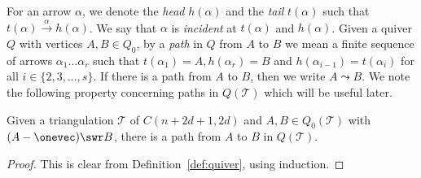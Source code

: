 For an arrow $\alpha$, we denote the \emph{head} $h(\alpha)$ and the \emph{tail} $t(\alpha)$ such that $t(\alpha) \xrightarrow{\alpha} h(\alpha)$. We say that $\alpha$ is \emph{incident} at $t(\alpha)$ and $h(\alpha)$. Given a quiver $Q$ with vertices $A,B \in Q_{0}$, by a \emph{path} in $Q$ from $A$ to $B$ we mean a finite sequence of arrows $\alpha_{1}\dots\alpha_{r}$ such that $t(\alpha_{1}) = A, h(\alpha_{r}) = B$ and $h(\alpha_{i - 1}) = t(\alpha_{i})$ for all $i \in \{2, 3, \dots, s\}$. If there is a path from $A$ to $B$, then we write $A \leadsto B$. We note the following property concerning paths in $Q(\mathcal{T})$ which will be useful later.

\begin{lemma}\label{lem:find_path}
Given a triangulation $\mathcal{T}$ of $C(n + 2d + 1, 2d)$ and $A, B \in Q_{0}(\mathcal{T})$ with $(A - \onevec) \swr B$, there is a path from $A$ to $B$ in $Q(\mathcal{T})$.
\end{lemma}
\begin{proof}
This is clear from Definition~\ref{def:quiver}, using induction.
\end{proof}

